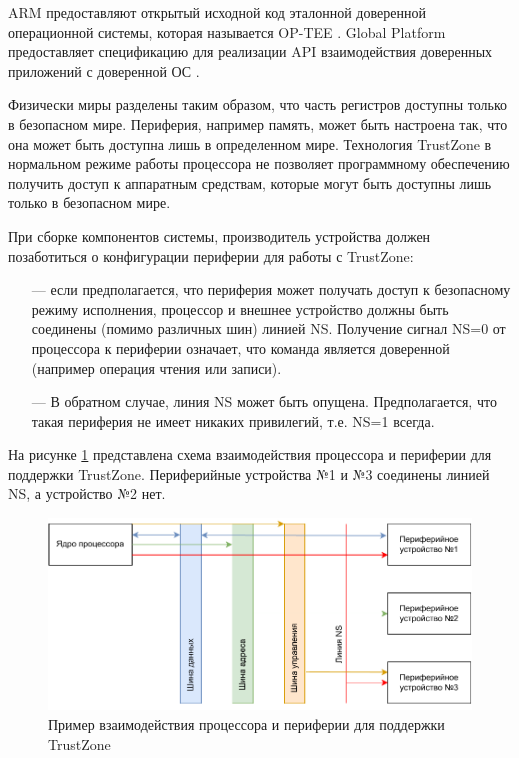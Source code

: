 ARM предоставляют открытый исходной код эталонной доверенной операционной системы, которая называется OP-TEE \cite{optee}. Global Platform предоставляет спецификацию для реализации API взаимодействия доверенных приложений \cite{teec-spec} с доверенной ОС \cite{tee-spec}.

Физически миры разделены таким образом, что часть регистров доступны только в безопасном мире. Периферия, например память, может быть настроена так, что она может быть доступна лишь в определенном мире. Технология TrustZone в нормальном режиме работы процессора не позволяет программному обеспечению получить доступ к аппаратным средствам, которые могут быть доступны лишь только в безопасном мире. 

При сборке компонентов системы, производитель устройства должен позаботиться о конфигурации периферии для работы с TrustZone:

\begin{itemize}
	\item [---] если предполагается, что периферия может получать доступ к безопасному режиму исполнения, процессор и внешнее устройство должны быть соединены (помимо различных шин) линией NS. Получение сигнал NS=0 от процессора к периферии означает, что команда является доверенной (например операция чтения или записи).
	\item [---] В обратном случае, линия NS может быть опущена. Предполагается, что такая периферия не имеет никаких привилегий, т.е. NS=1 всегда.
\end{itemize}

На рисунке \ref{fig:ns-bit} представлена схема взаимодействия процессора и периферии для поддержки TrustZone. Периферийные устройства №1 и №3 соединены линией NS, а устройство №2 нет.

\begin{figure}[h]
	\centering
	\includegraphics[width=\textwidth]{img/arm-ns.pdf}
	\caption{Пример взаимодействия процессора и периферии для поддержки TrustZone}
	\label{fig:ns-bit}
\end{figure}

